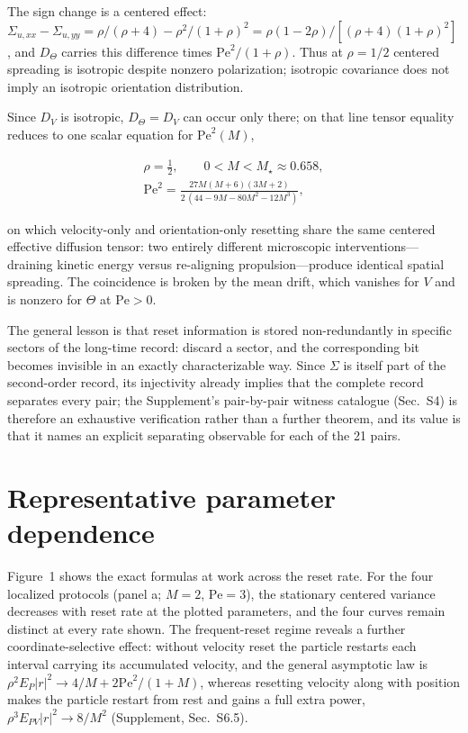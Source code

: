 The sign change is a centered effect: $\Sigma_{u,xx}-\Sigma_{u,yy}=\rho/(\rho+4)-\rho^2/(1+\rho)^2=\rho(1-2\rho)/[(\rho+4)(1+\rho)^2]$, and $D_\Theta$ carries this difference times $\mathrm{Pe}^2/(1+\rho)$. Thus at $\rho=1/2$ centered spreading is isotropic despite nonzero polarization; isotropic covariance does not imply an isotropic orientation distribution.

Since $D_V$ is isotropic, $D_\Theta=D_V$ can occur only there; on that line tensor equality reduces to one scalar equation for $\mathrm{Pe}^2(M)$,

\[
\begin{gathered}
\rho=\tfrac12,\qquad 0<M<M_\star\approx0.658,\\[2pt]
\mathrm{Pe}^2=\frac{27M(M+6)(3M+2)}{2\,(44-9M-80M^2-12M^3)},
\end{gathered}
\]


on which velocity-only and orientation-only resetting share the same centered effective diffusion tensor: two entirely different microscopic interventions---draining kinetic energy versus re-aligning propulsion---produce identical spatial spreading. The coincidence is broken by the mean drift, which vanishes for $V$ and is nonzero for $\Theta$ at $\mathrm{Pe}>0$.

The general lesson is that reset information is stored non-redundantly in specific sectors of the long-time record: discard a sector, and the corresponding bit becomes invisible in an exactly characterizable way. Since $\Sigma$ is itself part of the second-order record, its injectivity already implies that the complete record separates every pair; the Supplement's pair-by-pair witness catalogue (Sec.~S4) is therefore an exhaustive verification rather than a further theorem, and its value is that it names an explicit separating observable for each of the 21 pairs.

\section{Representative parameter dependence}\label{parameter-dependence}

Figure~1 shows the exact formulas at work across the reset rate. For the four localized protocols (panel a; $M=2$, $\mathrm{Pe}=3$), the stationary centered variance decreases with reset rate at the plotted parameters, and the four curves remain distinct at every rate shown. The frequent-reset regime reveals a further coordinate-selective effect: without velocity reset the particle restarts each interval carrying its accumulated velocity, and the general asymptotic law is $\rho^2E_P|r|^2\to4/M+2\mathrm{Pe}^2/(1+M)$, whereas resetting velocity along with position makes the particle restart from rest and gains a full extra power, $\rho^3E_{PV}|r|^2\to8/M^2$ (Supplement, Sec.~S6.5).

